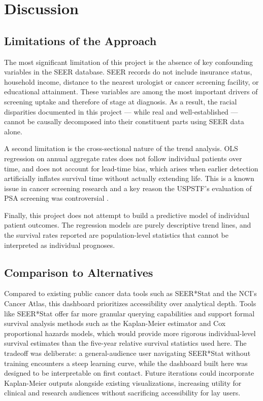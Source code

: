 \section{Discussion}

\subsection{Limitations of the Approach}

The most significant limitation of this project is the absence of key confounding
variables in the SEER database. SEER records do not include insurance status,
household income, distance to the nearest urologist or cancer screening facility, or
educational attainment. These variables are among the most important drivers of
screening uptake and therefore of stage at diagnosis. As a result, the racial
disparities documented in this project --- while real and well-established ---
cannot be causally decomposed into their constituent parts using SEER data alone.

A second limitation is the cross-sectional nature of the trend analysis. OLS
regression on annual aggregate rates does not follow individual patients over time,
and does not account for lead-time bias, which arises when earlier detection
artificially inflates survival time without actually extending life. This is a known
issue in cancer screening research and a key reason the USPSTF's evaluation of PSA
screening was controversial \cite{uspstf2012, uspstf2018}.

Finally, this project does not attempt to build a predictive model of individual
patient outcomes. The regression models are purely descriptive trend lines, and the
survival rates reported are population-level statistics that cannot be interpreted
as individual prognoses.

\subsection{Comparison to Alternatives}

Compared to existing public cancer data tools such as SEER*Stat and the NCI's Cancer
Atlas, this dashboard prioritizes accessibility over analytical depth. Tools like
SEER*Stat offer far more granular querying capabilities and support formal survival
analysis methods such as the Kaplan-Meier estimator and Cox proportional hazards
models, which would provide more rigorous individual-level survival estimates than
the five-year relative survival statistics used here. The tradeoff was deliberate:
a general-audience user navigating SEER*Stat without training encounters a steep
learning curve, while the dashboard built here was designed to be interpretable on
first contact. Future iterations could incorporate Kaplan-Meier outputs alongside
existing visualizations, increasing utility for clinical and research audiences
without sacrificing accessibility for lay users.

